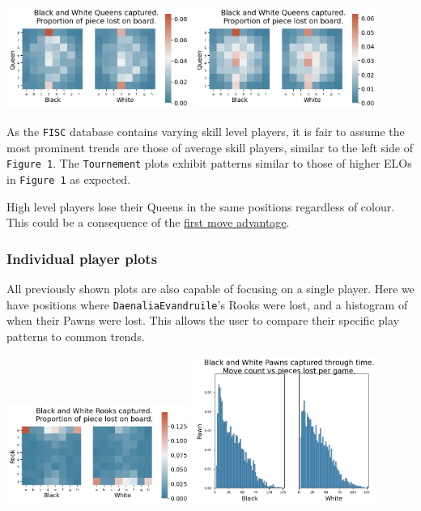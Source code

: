 \documentclass[11pt]{article}
\begin{document}
\begin{center}
\includegraphics[width=0.45\textwidth]{Images/_HEATMAP_Queen_FISC.png}
\includegraphics[width=0.45\textwidth]{Images/_HEATMAP_Queen_TOURNEMENTS.png}
\end{center}

As the \texttt{FISC} database contains varying skill level players, it is fair to assume the most prominent trends are those of average skill players, similar to the left side of \texttt{Figure 1}. The \texttt{Tournement} plots exhibit patterns similar to those of higher ELOs in \texttt{Figure 1} as expected.

High level players lose their Queens in the same positions regardless of colour. This could be a consequence of the \href{https://en.wikipedia.org/wiki/First-move\_advantage\_in\_chess}{first move advantage}.
\subsubsection{Individual player plots}
\label{sec:org9debea8}
All previously shown plots are also capable of focusing on a single player. Here we have positions where \texttt{DaenaliaEvandruile}'s Rooks were lost, and a histogram of when their Pawns were lost. This allows the user to compare their specific play patterns to common trends.

\begin{center}
\includegraphics[width=0.45\textwidth]{Images/DaenaliaEvandruile_HEATMAP_Rook.png}
\includegraphics[width=0.45\textwidth]{Images/DaenaliaEvandruile_HIST_Pawn.png}
\end{center}
\end{document}
